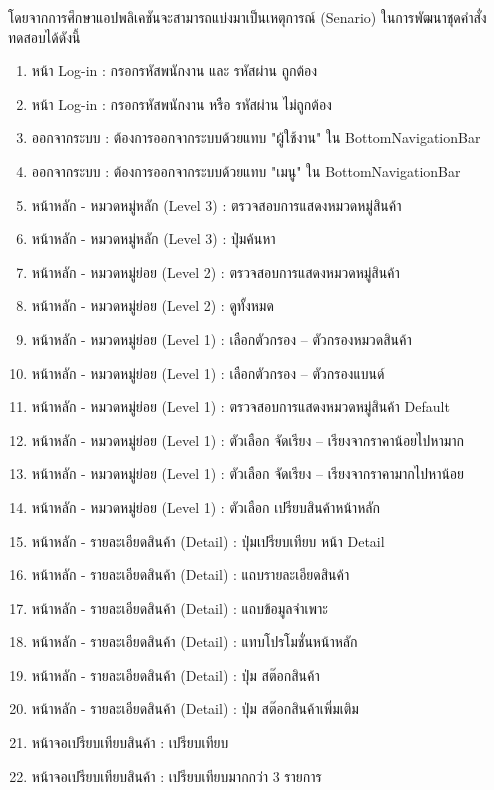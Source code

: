 โดยจากการศึกษาแอปพลิเคชันจะสามารถแบ่งมาเป็นเหตุการณ์ (Senario) ในการพัฒนาชุดคำสั่งทดสอบได้ดังนี้
    \begin{enumerate}
        \item หน้า Log-in : กรอกรหัสพนักงาน และ รหัสผ่าน ถูกต้อง
        \item หน้า Log-in : กรอกรหัสพนักงาน หรือ รหัสผ่าน ไม่ถูกต้อง
        \item ออกจากระบบ : ต้องการออกจากระบบด้วยแทบ "ผู้ใช้งาน" ใน BottomNavigationBar
        \item ออกจากระบบ : ต้องการออกจากระบบด้วยแทบ "เมนู" ใน BottomNavigationBar
        \item หน้าหลัก - หมวดหมู่หลัก (Level 3) : ตรวจสอบการแสดงหมวดหมู่สินค้า
        \item หน้าหลัก - หมวดหมู่หลัก (Level 3) : ปุ่มค้นหา
        \item หน้าหลัก - หมวดหมู่ย่อย (Level 2) : ตรวจสอบการแสดงหมวดหมู่สินค้า
        \item หน้าหลัก - หมวดหมู่ย่อย (Level 2) : ดูทั้งหมด
        \item หน้าหลัก - หมวดหมู่ย่อย (Level 1) : เลือกตัวกรอง – ตัวกรองหมวดสินค้า
        \item หน้าหลัก - หมวดหมู่ย่อย (Level 1) : เลือกตัวกรอง – ตัวกรองแบนด์
        \item หน้าหลัก - หมวดหมู่ย่อย (Level 1) : ตรวจสอบการแสดงหมวดหมู่สินค้า Default
        \item หน้าหลัก - หมวดหมู่ย่อย (Level 1) : ตัวเลือก จัดเรียง – เรียงจากราคาน้อยไปหามาก
        \item หน้าหลัก - หมวดหมู่ย่อย (Level 1) : ตัวเลือก จัดเรียง – เรียงจากราคามากไปหาน้อย
        \item หน้าหลัก - หมวดหมู่ย่อย (Level 1) : ตัวเลือก เปรียบสินค้าหน้าหลัก
        \item หน้าหลัก - รายละเอียดสินค้า (Detail) : ปุ่มเปรียบเทียบ หน้า Detail
        \item หน้าหลัก - รายละเอียดสินค้า (Detail) : แถบรายละเอียดสินค้า
        \item หน้าหลัก - รายละเอียดสินค้า (Detail) : แถบข้อมูลจำเพาะ
        \item หน้าหลัก - รายละเอียดสินค้า (Detail) : แทบโปรโมชั่นหน้าหลัก
        \item หน้าหลัก - รายละเอียดสินค้า (Detail) : ปุ่ม สต๊อกสินค้า
        \item หน้าหลัก - รายละเอียดสินค้า (Detail) : ปุ่ม สต๊อกสินค้าเพิ่มเติม
        \item หน้าจอเปรียบเทียบสินค้า : เปรียบเทียบ
        \item หน้าจอเปรียบเทียบสินค้า : เปรียบเทียบมากกว่า 3 รายการ

\end{enumerate}
